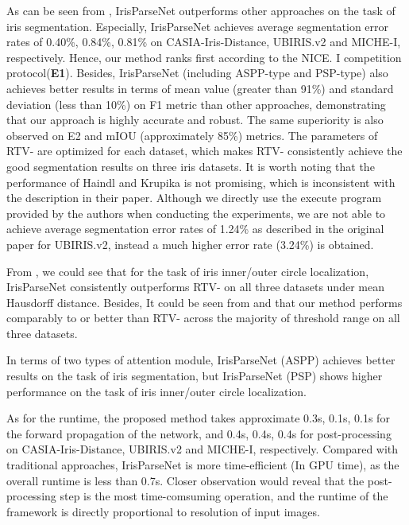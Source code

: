 \documentclass[journal]{IEEEtran}
\begin{document}
As can be seen from , IrisParseNet outperforms other approaches on the task of iris segmentation.
Especially, IrisParseNet achieves average segmentation error rates of 0.40\%, 0.84\%, 0.81\% on CASIA-Iris-Distance, UBIRIS.v2 and MICHE-I, respectively.
Hence, our method ranks first according to the NICE. I competition protocol(\textbf{E1}).
Besides, IrisParseNet (including ASPP-type and PSP-type) also achieves better results in terms of mean value (greater than 91\%) and standard deviation (less than 10\%) on F1 metric than other approaches, demonstrating that our approach is highly accurate and robust.
The same superiority is also observed on E2 and mIOU (approximately 85\%) metrics.
The parameters of RTV- are optimized for each dataset, which makes RTV- consistently achieve the good segmentation results on three iris datasets.
It is worth noting that the performance of Haindl and Krupika\cite{haindl2015unsupervised} is not promising, which is inconsistent with the description in their paper.
Although we directly use the execute program provided by the authors when conducting the experiments, we are not able to achieve average segmentation error rates of 1.24\% as described in the original paper for UBIRIS.v2, instead a much higher error rate (3.24\%) is obtained.

From , we could see that for the task of iris inner/outer circle localization, IrisParseNet consistently outperforms RTV- on all three datasets under mean Hausdorff distance.
Besides, It could be seen from  and  that our method performs comparably to or better than RTV- across the majority of threshold range on all three datasets.

In terms of two types of attention module, IrisParseNet (ASPP) achieves better results on the task of iris segmentation, but IrisParseNet (PSP) shows higher performance on the task of iris inner/outer circle localization.

As for the runtime, the proposed method takes approximate 0.3s, 0.1s, 0.1s for the forward propagation of the network, and 0.4s, 0.4s, 0.4s for post-processing on CASIA-Iris-Distance, UBIRIS.v2 and MICHE-I, respectively.
Compared with traditional approaches, IrisParseNet is more time-efficient (In GPU time), as the overall runtime is less than 0.7s.
Closer observation would reveal that the post-processing step is the most time-comsuming operation, and the runtime of the framework is directly proportional to resolution of input images.
\end{document}
